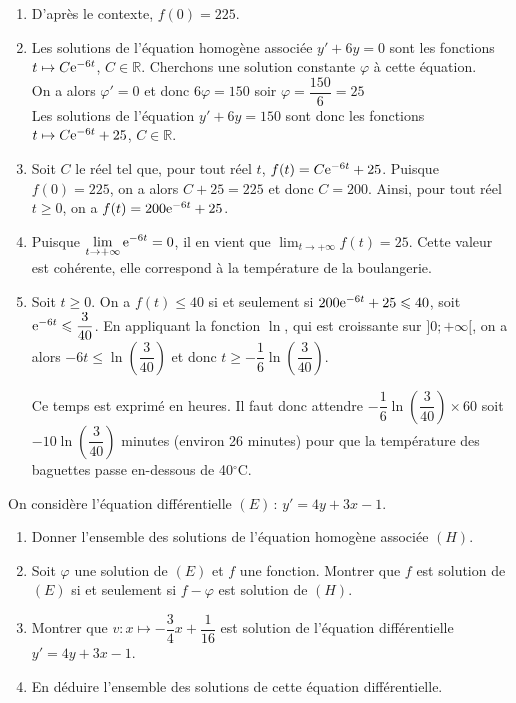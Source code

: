 \documentclass[11pt,fleqn, openany]{book} %
\begin{document}
\begin{solution} \hspace{0pt}
\begin{enumerate}
\item D'après le contexte, $f(0)=225$.
\item Les solutions de l'équation homogène associée $y'+6y=0$ sont les fonctions $t \mapsto C\mathrm{e}^{-6t}$, $C\in\mathbb{R}$. Cherchons une solution constante $\varphi$ à cette équation. \\On a alors $\varphi'=0$ et donc $6\varphi=150$ soir $\varphi = \dfrac{150}{6}=25$\\ Les solutions de l'équation $y'+6y=150$ sont donc les fonctions $t \mapsto C\mathrm{e}^{-6t}+25$, $C\in\mathbb{R}$.

\item Soit $C$ le réel tel que, pour tout réel $t$, $f(t)=C\mathrm{e}^{-6t}+25$. Puisque $f(0)=225$, on a alors $C+25=225$ et donc $C=200$. Ainsi, pour tout réel $t \geqslant 0$, on a $f(t)=200\mathrm{e}^{-6t}+25$.
\item Puisque $\displaystyle\lim_{t \to + \infty}\mathrm{e}^{-6t}=0$, il en vient que  $\displaystyle\lim_{t \to + \infty}f(t)=25$. Cette valeur est cohérente, elle correspond à la température de la boulangerie.
\item Soit $t\geqslant 0$. On a $f(t) \leqslant 40$ si et seulement si $200\mathrm{e}^{-6t}+25 \leqslant 40$, soit $\mathrm{e}^{-6t}\leqslant \dfrac{3}{40}$. En appliquant la fonction $\ln$, qui est croissante sur $]0;+\infty[$, on a alors $-6t \leqslant \ln\left(\dfrac{3}{40}\right)$ et donc $t \geqslant -\dfrac{1}{6}\ln\left(\dfrac{3}{40}\right)$.

Ce temps est exprimé en heures. Il faut donc attendre $-\dfrac{1}{6}\ln\left(\dfrac{3}{40}\right) \times 60$ soit $-10\ln\left(\dfrac{3}{40}\right)$ minutes (environ 26 minutes) pour que la température des baguettes passe en-dessous de 40$^{\circ}$C.

\end{enumerate}\end{solution}




\begin{exercise}[topic=diff03]On considère l'équation différentielle $(E)\, :\,y'=4y+3x-1$.
\begin{enumerate}
\item Donner l'ensemble des solutions de l'équation homogène associée $(H)$.
\item Soit $\varphi$ une solution de $(E)$ et $f$ une fonction. Montrer que $f$ est solution de $(E)$ si et seulement si $f-\varphi$ est solution de $(H)$.
\item Montrer que  $v:x\mapsto -\dfrac{3}{4}x+\dfrac{1}{16}$ est solution de l'équation différentielle $y'=4y+3x-1$.
\item En déduire l'ensemble des solutions de cette équation différentielle.
\end{enumerate}\end{exercise}
\end{document}
